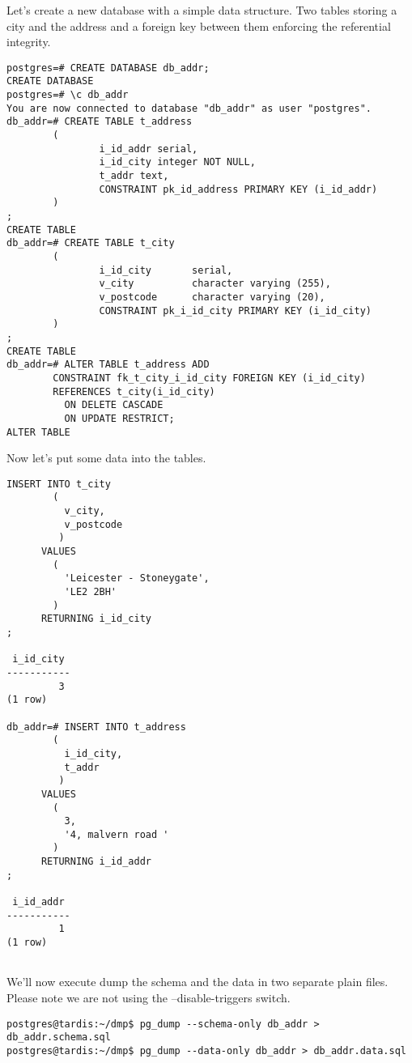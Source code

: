 Let's create a new database with a simple data structure. Two tables storing a city and the address 
and a foreign key between them enforcing the referential integrity.

\begin{lstlisting}[style=pgsql]
postgres=# CREATE DATABASE db_addr;
CREATE DATABASE
postgres=# \c db_addr 
You are now connected to database "db_addr" as user "postgres".
db_addr=# CREATE TABLE t_address
        (
                i_id_addr serial,
                i_id_city integer NOT NULL,
                t_addr text,
                CONSTRAINT pk_id_address PRIMARY KEY (i_id_addr)
        )
;
CREATE TABLE
db_addr=# CREATE TABLE t_city
        (
                i_id_city       serial,
                v_city          character varying (255),
                v_postcode      character varying (20),
                CONSTRAINT pk_i_id_city PRIMARY KEY (i_id_city)
        )
;
CREATE TABLE
db_addr=# ALTER TABLE t_address ADD 
	    CONSTRAINT fk_t_city_i_id_city FOREIGN KEY (i_id_city)  
	    REFERENCES t_city(i_id_city) 
	      ON DELETE CASCADE 
	      ON UPDATE RESTRICT;
ALTER TABLE

\end{lstlisting}

Now let's put some data into the tables.

\begin{lstlisting}[style=pgsql]
INSERT INTO t_city
	    ( 
	      v_city,	
	      v_postcode
	     )
      VALUES
	    (
	      'Leicester - Stoneygate',
	      'LE2 2BH'
	    )
      RETURNING i_id_city
;

 i_id_city 
-----------
         3
(1 row)

db_addr=# INSERT INTO t_address
	    ( 
	      i_id_city,	
	      t_addr
	     )
      VALUES
	    (
	      3,
	      '4, malvern road '
	    )
      RETURNING i_id_addr
;

 i_id_addr 
-----------
         1
(1 row)


\end{lstlisting}

We'll now execute dump the schema and the data in two separate plain files. Please note we are not using 
the --disable-triggers switch.

\begin{verbatim}
postgres@tardis:~/dmp$ pg_dump --schema-only db_addr > db_addr.schema.sql
postgres@tardis:~/dmp$ pg_dump --data-only db_addr > db_addr.data.sql

\end{verbatim}

